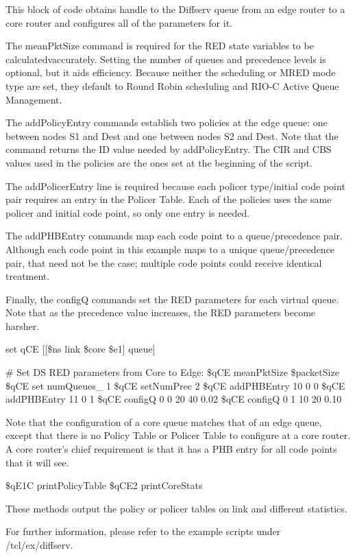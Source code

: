 This block of code obtains handle to the Diffserv queue from an edge router to
a core router and configures all of the parameters for it.

The meanPktSize command is required for the RED state variables to be 
calculatedvaccurately.  Setting the number of queues and precedence levels is 
optional, but it aids efficiency. Because neither the scheduling or MRED mode 
type are set, they default to Round Robin scheduling and RIO-C Active Queue 
Management.

The addPolicyEntry commands establish two policies at the edge queue: one 
between nodes S1 and Dest and one between nodes S2 and Dest.  Note that the 
\code{[$s1 id]} command returns the ID value needed by addPolicyEntry.  
The CIR and CBS values used in the policies are the ones set at the beginning 
of the script.

The addPolicerEntry line is required because each policer type/initial code 
point pair requires an entry in the Policer Table.  Each of the policies 
uses the same policer and initial code point, so only one entry is needed.

The addPHBEntry commands map each code point to a queue/precedence pair.  
Although each code point in this example maps to a unique queue/precedence 
pair, that need not be the case; multiple code points could receive identical 
treatment.

Finally, the configQ commands set the RED parameters for each virtual queue.  
Note that as the precedence value increases, the RED parameters become harsher.

\begin{program}

set qCE [[\$ns link \$core \$e1] queue]

# Set DS RED parameters from Core to Edge:
\$qCE meanPktSize \$packetSize
\$qCE set numQueues_ 1
\$qCE setNumPrec 2
\$qCE addPHBEntry 10 0 0
\$qCE addPHBEntry 11 0 1
\$qCE configQ 0 0 20 40 0.02
\$qCE configQ 0 1 10 20 0.10

\end{program}

Note that the configuration of a core queue matches that of an edge queue, 
except that there is no Policy Table or Policer Table to configure at a core 
router.  A core router's chief requirement is that it has a PHB entry for 
all code points that it will see.

\begin{program}
\$qE1C printPolicyTable
\$qCE2 printCoreStats
\end{program}

These methods output the policy or policer tables on link and different 
statistics.  

For further information, please refer to the example scripts under 
\ns/tcl/ex/diffserv.
